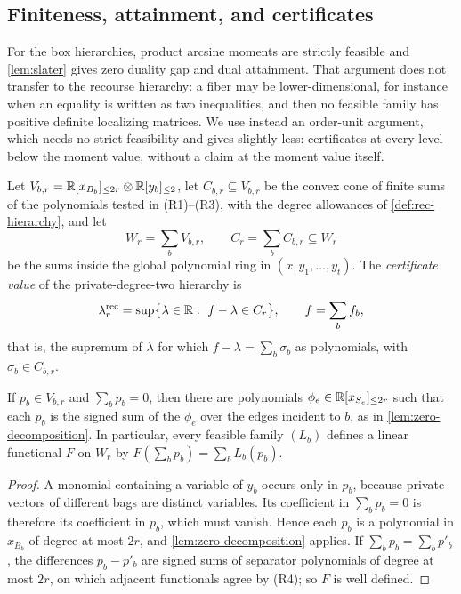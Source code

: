 \subsection{Finiteness, attainment, and certificates}\label{sec:rec-dual}

For the box hierarchies, product arcsine moments are strictly feasible and
\cref{lem:slater} gives zero duality gap and dual attainment. That argument
does not transfer to the recourse hierarchy: a fiber may be
lower-dimensional, for instance when an equality is written as two
inequalities, and then no feasible family has positive definite localizing
matrices. We use instead an order-unit argument, which needs no strict
feasibility and gives slightly less: certificates at every level below the
moment value, without a claim at the moment value itself.

Let $V_{b,r}=\mathbb{R}[x_{B_b}]_{\le 2r}\otimes\mathbb{R}[y_b]_{\le 2}$, let $C_{b,r}\subseteq
V_{b,r}$ be the convex cone of finite sums of the polynomials tested in
(R1)--(R3), with the degree allowances of \cref{def:rec-hierarchy}, and let
\[
  W_r=\sum_bV_{b,r},\qquad C_r=\sum_bC_{b,r}\subseteq W_r
\]
be the sums inside the global polynomial ring in $(x,y_1,\dots,y_t)$. The
\emph{certificate value} of the private-degree-two hierarchy is
\begin{equation}\label{eq:rec-certificate}
  \lambda^{\mathrm{rec}}_r=\sup\bigl\{\lambda\in\mathbb{R}:\ f-\lambda\in C_r\bigr\},
  \qquad f=\sum_bf_b ,
\end{equation}
that is, the supremum of $\lambda$ for which $f-\lambda=\sum_b\sigma_b$ as
polynomials, with $\sigma_b\in C_{b,r}$.

\begin{lemma}
\label{lem:rec-zero}
If $p_b\in V_{b,r}$ and $\sum_bp_b=0$, then there are polynomials
$\phi_e\in\mathbb{R}[x_{S_e}]_{\le 2r}$ such that each $p_b$ is the signed sum of the
$\phi_e$ over the edges incident to $b$, as in \cref{lem:zero-decomposition}.
In particular, every feasible family $(L_b)$ defines a linear functional
$F$ on $W_r$ by $F(\sum_bp_b)=\sum_bL_b(p_b)$.
\end{lemma}

\begin{proof}
A monomial containing a variable of $y_b$ occurs only in $p_b$, because
private vectors of different bags are distinct variables. Its coefficient
in $\sum_bp_b=0$ is therefore its coefficient in $p_b$, which must vanish.
Hence each $p_b$ is a polynomial in $x_{B_b}$ of degree at most $2r$, and
\cref{lem:zero-decomposition} applies. If $\sum_bp_b=\sum_bp'_b$, the
differences $p_b-p'_b$ are signed sums of separator polynomials of degree at
most $2r$, on which adjacent functionals agree by (R4); so $F$ is well
defined.
\end{proof}

